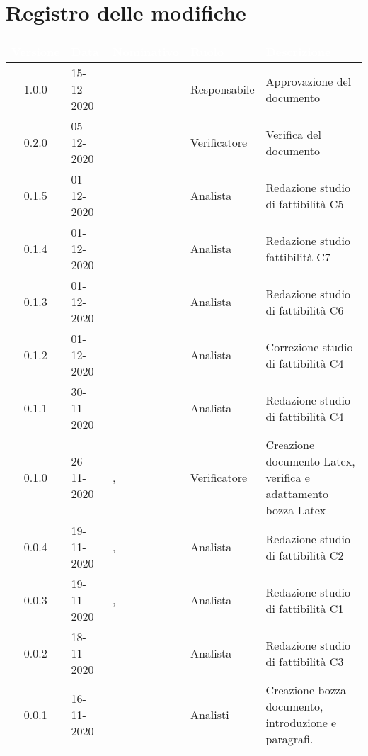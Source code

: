 \section*{Registro delle modifiche}
{
\renewcommand{\arraystretch}{1.5}
\centering
\begin{longtable}{c C{2.6cm} C{3cm} C{2.6cm} C{5cm}}
\textcolor{white}{\textbf{Versione}}&
\textcolor{white}{\textbf{Data}}&
\textcolor{white}{\textbf{Nominativo}}&
\textcolor{white}{\textbf{Ruolo}}&
\textcolor{white}{\textbf{Descrizione}}\\	
\endhead

1.0.0 & 15-12-2020 & \SG{} & Responsabile & Approvazione del documento\\  
0.2.0 & 05-12-2020 & \BM{} & Verificatore & Verifica del documento\\
0.1.5 & 01-12-2020 & \SH{} & Analista & Redazione studio di fattibilità C5 \\
0.1.4 & 01-12-2020 & \PA{} & Analista & Redazione studio fattibilità C7\\
0.1.3 & 01-12-2020 & \RA{} & Analista & Redazione studio di fattibilità C6\\
0.1.2 & 01-12-2020 & \ZM{} & Analista & Correzione studio di fattibilità C4\\
0.1.1 & 30-11-2020 & \ZM{} & Analista & Redazione studio di fattibilità C4\\
0.1.0 & 26-11-2020 & \SG{}, \BM{} & Verificatore & Creazione documento Latex, verifica e adattamento bozza Latex \\
0.0.4 & 19-11-2020 & \ZM{}, \SP{} & Analista & Redazione studio di fattibilità C2\\
0.0.3 & 19-11-2020 & \ZM{}, \SP{} & Analista & Redazione studio di fattibilità C1\\		
0.0.2 & 18-11-2020 & \PA{} & Analista & Redazione studio di fattibilità C3\\
0.0.1 & 16-11-2020 & \Gruppo{} & Analisti & Creazione bozza documento, introduzione e paragrafi. \\	
\end{longtable}
}
